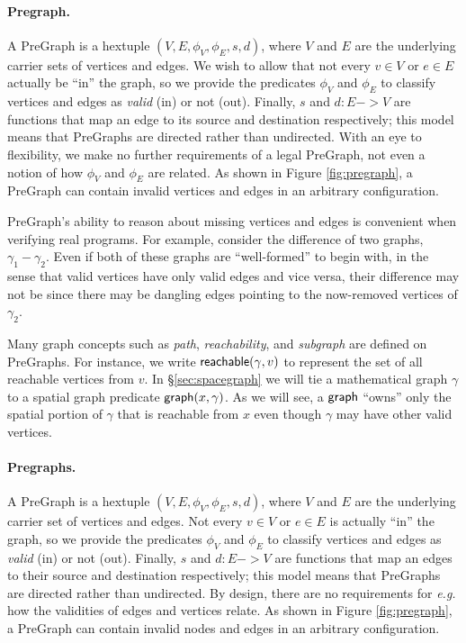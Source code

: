 \paragraph{Pregraph.} A PreGraph is a hextuple $(V, E, \phi_V, \phi_E, s, d)$,
where $V$ and $E$ are the underlying carrier sets of vertices and edges. We wish to
allow that not every $v \in V$ or $e \in E$ actually be ``in'' the graph, so we
provide the predicates $\phi_V$ and $\phi_E$ to classify vertices and edges as 
\emph{valid} (in) or not (out).  Finally, $s$ and $d : E -> V$ are functions that map 
an edge to its source and destination respectively; this model means that PreGraphs 
are directed rather than undirected. With an eye to flexibility, we make no further 
requirements of a legal PreGraph, not even a notion of how $\phi_V$ and $\phi_E$ are 
related. As shown in Figure \ref{fig:pregraph}, a PreGraph can contain invalid 
vertices  and edges in an arbitrary configuration.

PreGraph's ability to reason about missing vertices and edges is convenient when 
verifying real programs.  For example, consider the difference of two graphs, $\gamma_1
- \gamma_2$.  Even if both of these graphs are ``well-formed'' to begin with, in the 
sense that valid vertices have only valid edges and vice versa, their difference 
may not be since there may be dangling edges pointing to the now-removed vertices of $\gamma_2$.

Many graph concepts such as \emph{path}, \emph{reachability}, and \emph{subgraph} are defined on PreGraphs. For instance, we write $\mathsf{reachable}(\gamma,v)$ to represent the set of all reachable vertices from $v$.
In \S\ref{sec:spacegraph} we will tie a mathematical graph $\gamma$ to a spatial graph predicate
$\mathsf{graph}(x, \gamma)$.   As we will see, a $\mathsf{graph}$ ``owns'' only the
spatial portion of $\gamma$ that is reachable
from $x$ even though $\gamma$ may have other valid vertices.
\fi
\iffalse
\paragraph{Pregraphs.} A PreGraph is a hextuple $(V, E, \phi_V, \phi_E, s, d)$,
where $V$ and $E$ are the underlying carrier set of vertices and edges.  Not every $v \in V$ or $e \in E$ is actually ``in'' the graph, so we provide the predicates $\phi_V$ and $\phi_E$ to classify vertices and edges as \emph{valid} (in) or not (out).  Finally, $s$ and $d : E -> V$ are functions that map an edges to their source and destination respectively; this model means that PreGraphs are directed rather than undirected.  By design, there are no requirements for \emph{e.g.} how the validities of edges and vertices relate.  As shown in Figure \ref{fig:pregraph}, a PreGraph can contain invalid nodes and edges in an arbitrary configuration.


